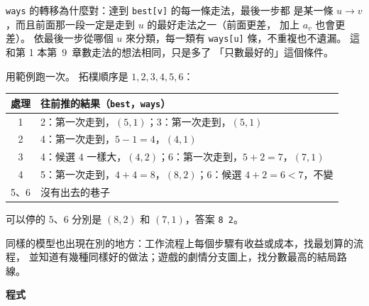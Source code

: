 \texttt{ways} 的轉移為什麼對：達到 \texttt{best[v]} 的每一條走法，最後一步都
是某一條 $u \to v$，而且前面那一段一定是走到 $u$ 的最好走法之一（前面更差，
加上 $a_v$ 也會更差）。 依最後一步從哪個 $u$ 來分類，每一類有
\texttt{ways[u]} 條，不重複也不遺漏。 這和第 1 本第~9~章數走法的想法相同，只是多了
「只數最好的」這個條件。

用範例跑一次。 拓樸順序是 $1, 2, 3, 4, 5, 6$：

\begin{center}
\begin{tabular}{cl}
\toprule
處理 & 往前推的結果（\texttt{best}，\texttt{ways}） \\
\midrule
1 & 2：第一次走到，$(5, 1)$；3：第一次走到，$(5, 1)$ \\
2 & 4：第一次走到，$5 - 1 = 4$，$(4, 1)$ \\
3 & 4：候選 $4$ 一樣大，$(4, 2)$；6：第一次走到，$5 + 2 = 7$，$(7, 1)$ \\
4 & 5：第一次走到，$4 + 4 = 8$，$(8, 2)$；6：候選 $4 + 2 = 6 < 7$，不變 \\
5、6 & 沒有出去的巷子 \\
\bottomrule
\end{tabular}
\end{center}

可以停的 $5$、$6$ 分別是 $(8, 2)$ 和 $(7, 1)$，答案 \texttt{8 2}。

同樣的模型也出現在別的地方：工作流程上每個步驟有收益或成本，找最划算的流程，
並知道有幾種同樣好的做法；遊戲的劇情分支圖上，找分數最高的結局路線。

\textbf{程式}

